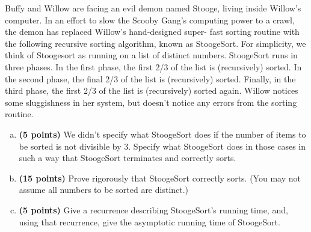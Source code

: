 \documentclass[11pt, letterpaper]{article}
\begin{document}
\pagebreak
\begin{problem}
    Buffy and Willow are facing an evil demon named Stooge, living inside Willow's computer. In an effort to slow the Scooby Gang's computing power to a crawl, the demon has replaced Willow's hand-designed super- fast sorting routine with the following recursive sorting algorithm, known as StoogeSort. For simplicity, we think of Stoogesort as running on a list of distinct numbers. StoogeSort runs in three phases. In the first phase, the first 2/3 of the list is (recursively) sorted. In the second phase, the final 2/3 of the list is (recursively) sorted.  Finally, in the third phase, the first 2/3 of the list is (recursively) sorted again.  Willow notices some sluggishness in her system, but doesn't notice any errors from the sorting routine.
    \begin{enumerate}[(a)]
        \item {\bf (5 points)} We didn't specify what StoogeSort does if the number of items to be sorted is not divisible by 3.  Specify what StoogeSort does in those cases in such a way that StoogeSort terminates and correctly sorts.  
        \item {\bf (15 points)} Prove rigorously that StoogeSort correctly sorts. (You may not assume all numbers to be sorted are distinct.)
        \item {\bf (5 points)} Give a recurrence describing StoogeSort's running time, and, using that recurrence, give the asymptotic running time of StoogeSort.
    \end{enumerate}
\end{problem}
\end{document}
